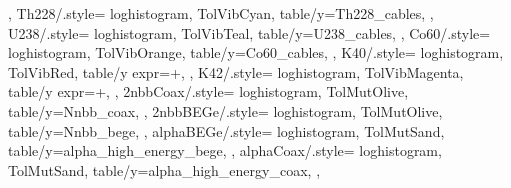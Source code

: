 {{  },
  Th228/.style={%
    loghistogram,
    TolVibCyan,
    table/y=Th228_cables,
  },
  U238/.style={%
    loghistogram,
    TolVibTeal,
    table/y=U238_cables,
  },
  Co60/.style={%
    loghistogram,
    TolVibOrange,
    table/y=Co60_cables,
  },
  K40/.style={%
    loghistogram,
    TolVibRed,
    table/y expr=+,
  },
  K42/.style={%
    loghistogram,
    TolVibMagenta,
    table/y expr=+,
  },
  2nbbCoax/.style={%
    loghistogram,
    TolMutOlive,
    table/y=Nnbb_coax,
  },
  2nbbBEGe/.style={%
    loghistogram,
    TolMutOlive,
    table/y=Nnbb_bege,
  },
  alphaBEGe/.style={%
    loghistogram,
    TolMutSand,
    table/y=alpha_high_energy_bege,
  },
  alphaCoax/.style={%
    loghistogram,
    TolMutSand,
    table/y=alpha_high_energy_coax,
  },
}

\newcommand{\addbrasilianplot}{%
  \addplot[3sigu] table {\loadedtable};
  \addplot[3sigl] table {\loadedtable};
  \addplot[3sigb] fill between [of=3sigu and 3sigl];
  \addplot[2sigu] table {\loadedtable};
  \addplot[2sigl] table {\loadedtable};
  \addplot[2sigb] fill between [of=2sigu and 2sigl];
  \addplot[1sigu] table {\loadedtable};
  \addplot[1sigl] table {\loadedtable};
  \addplot[1sigb] fill between [of=1sigu and 1sigl];
  \addplot[ratio] table {\loadedtable};
}
